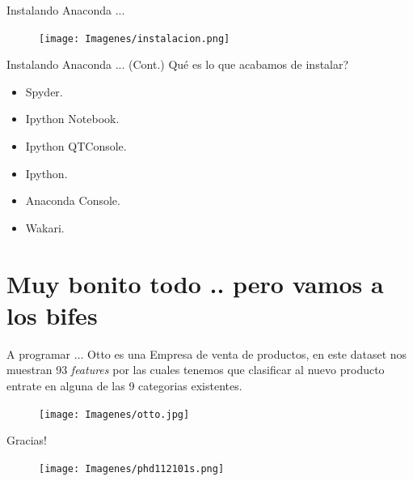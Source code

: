 \documentclass[bigger]{beamer}
\begin{document}
\begin{frame}[fragile]{Instalando Anaconda ...}
     \begin{figure}[h]
        \texttt{[image: Imagenes/instalacion.png]}
\end{figure}
\end{frame}
\begin{frame}{Instalando Anaconda ... (Cont.)}
Qué es lo que acabamos de instalar?
\begin{itemize}
    \item Spyder.
    \item Ipython Notebook.
    \item Ipython QTConsole.
    \item Ipython.
    \item Anaconda Console.
    \item Wakari.
\end{itemize}
\end{frame}
\section{Muy bonito todo .. pero vamos a los bifes}
\begin{frame}{A programar ...}
Otto es una Empresa de venta de productos, en este dataset nos muestran 93 \emph{features} por las cuales tenemos que clasificar al nuevo producto entrate en alguna de las 9 categorias existentes.
 \begin{figure}[h]
        \texttt{[image: Imagenes/otto.jpg]}
\end{figure}
\end{frame}

\begin{frame}{Gracias!}
 \begin{figure}[h]
        \texttt{[image: Imagenes/phd112101s.png]}
\end{figure}

\end{frame}
\end{document}
